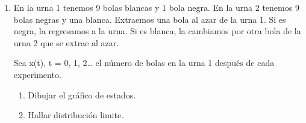 \documentclass{templateNote}
\begin{document}
\begin{enumerate}
    \newpage
    \item En la urna 1 tenemos 9 bolas blancas y 1 bola negra. En la urna 2 tenemos 9 bolas
    negras y una blanca. Extraemos una bola al azar de la urna 1. Si es negra, la regresamos a
    la urna. Si es blanca, la cambiamos por otra bola de la urna 2 que se extrae al azar. 

    Sea x(t), t = 0, 1, 2… el número de bolas en la urna 1 después de cada experimento. 

    \begin{enumerate}[label=\alph*)]
        \item Dibujar el gráfico de estados.
        \item Hallar distribución limite.
    \end{enumerate}

\end{enumerate}
\end{document}
